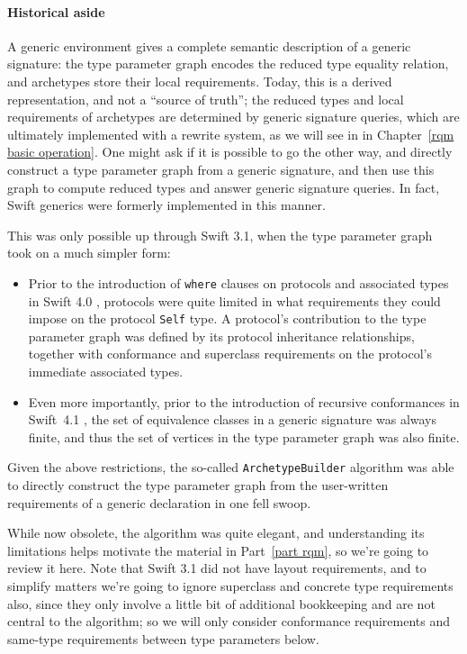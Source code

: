 \documentclass[../generics]{subfiles}
\begin{document}
\paragraph{Historical aside} A generic environment gives a complete semantic description of a generic signature: the type parameter graph encodes the reduced type equality relation, and archetypes store their local requirements. Today, this is a derived representation, and not a ``source of truth''; the reduced types and local requirements of archetypes are determined by generic signature queries, which are ultimately implemented with a rewrite system, as we will see in in Chapter~\ref{rqm basic operation}. One might ask if it is possible to go the other way, and directly construct a type parameter graph from a generic signature, and then use this graph to compute reduced types and answer generic signature queries. In fact, Swift generics were formerly implemented in this manner.

This was only possible up through Swift 3.1, when the type parameter graph took on a much simpler form:
\begin{itemize}
\item Prior to the introduction of \texttt{where} clauses on protocols and associated types in Swift 4.0 \cite{se0142}, protocols were quite limited in what requirements they could impose on the protocol \texttt{Self} type. A protocol's contribution to the type parameter graph was defined by its protocol inheritance relationships, together with conformance and superclass requirements on the protocol's immediate associated types.
\item Even more importantly, prior to the introduction of recursive conformances in Swift~4.1 \cite{se0157}, the set of equivalence classes in a generic signature was always finite, and thus the set of vertices in the type parameter graph was also finite.
\end{itemize}
Given the above restrictions, the so-called \texttt{ArchetypeBuilder} algorithm was able to directly construct the type parameter graph from the user-written requirements of a generic declaration in one fell swoop.

While now obsolete, the algorithm was quite elegant, and understanding its limitations helps motivate the material in Part~\ref{part rqm}, so we're going to review it here. Note that Swift 3.1 did not have layout requirements, and to simplify matters we're going to ignore superclass and concrete type requirements also, since they only involve a little bit of additional bookkeeping and are not central to the algorithm; so we will only consider conformance requirements and same-type requirements between type parameters below.
\end{document}
